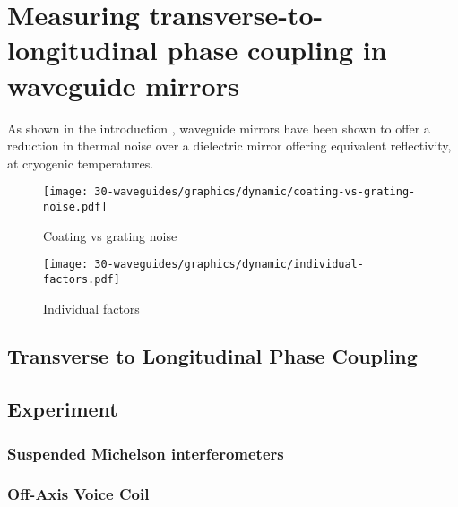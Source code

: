 \chapter{Measuring transverse-to-longitudinal phase coupling in waveguide mirrors}
\label{c:waveguides}

As shown in the introduction , waveguide mirrors have been shown to offer a reduction in thermal noise over a dielectric mirror offering equivalent reflectivity, at cryogenic temperatures.


\begin{figure}
  \begin{center}
    \texttt{[image: 30-waveguides/graphics/dynamic/coating-vs-grating-noise.pdf]}
    \caption{Coating vs grating noise}
    \label{fig:coating-vs-grating-noise}
  \end{center}
\end{figure}

\begin{figure}
  \begin{center}
    \texttt{[image: 30-waveguides/graphics/dynamic/individual-factors.pdf]}
    \caption{Individual factors}
    \label{fig:individual-factors}
  \end{center}
\end{figure}

\section{Transverse to Longitudinal Phase Coupling}

\section{Experiment}

\subsection{Suspended Michelson interferometers}

\subsection{Off-Axis Voice Coil}

